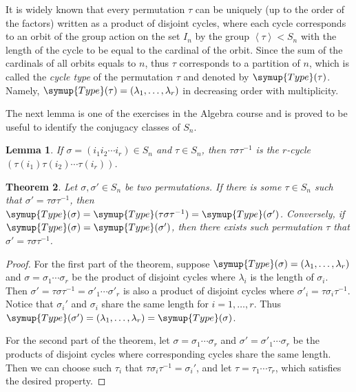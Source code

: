 \documentclass{assignment}[2019/10/15]
\newcommand{\lr}[3]{\left#1#3\right#2}
\theoremstyle{plain}
\newtheorem{theorem}{Theorem}[section]
\newtheorem{lemma}[theorem]{Lemma}
\newcommand{\Type}{\mathop{}\!\symup{Type}}
\begin{document}
    It is widely known that every permutation $\tau$ can be uniquely (up to the order of the factors) written as a product of disjoint cycles, where each cycle corresponds to an orbit of the group action on the set $I_n$ by the group $\lr<>\tau < S_n$ with the length of the cycle to be equal to the cardinal of the orbit. Since the sum of the cardinals of all orbits equals to $n$, thus $\tau$ corresponds to a partition of $n$, which is called the \emph{cycle type} of the permutation $\tau$ and denoted by $\Type(\tau)$. Namely, $\Type(\tau)=(\lambda_1, \dotsc, \lambda_r)$ in decreasing order with multiplicity.

    The next lemma is one of the exercises in the Algebra course and is proved to be useful to identify the conjugacy classes of $S_n$.

    \begin{lemma}
        If $\sigma = (i_1 i_2 \dotsb i_r)\in S_n$ and $\tau\in S_n$, then $\tau\sigma\tau^{-1}$ is the $r$-cycle $\left(\tau(i_1) \tau(i_2) \dotsb \tau(i_r)\right)$.
    \end{lemma}

    \begin{theorem}
        Let $\sigma, \sigma'\in S_n$ be two permutations. If there is some $\tau\in S_n$ such that $\sigma'=\tau\sigma\tau^{-1}$, then $\Type(\sigma)=\Type(\tau\sigma\tau^{-1}) = \Type(\sigma')$. Conversely, if $\Type(\sigma) = \Type(\sigma')$, then there exists such permutation $\tau$ that $\sigma' = \tau\sigma\tau^{-1}$.
    \end{theorem}

    \begin{proof}
        For the first part of the theorem, suppose $\Type(\sigma) = (\lambda_1, \dotsc, \lambda_r)$ and $\sigma=\sigma_1\dotsb\sigma_r$ be the product of disjoint cycles where $\lambda_i$ is the length of $\sigma_i$. Then $\sigma' = \tau\sigma\tau^{-1} = \sigma'_1\dotsb \sigma'_r$ is also a product of disjoint cycles where $\sigma'_i = \tau\sigma_i\tau^{-1}$. Notice that $\sigma_i'$ and $\sigma_i$ share the same length for $i= 1, \dotsc, r$. Thus $\Type(\sigma') = (\lambda_1, \dotsc, \lambda_r) = \Type(\sigma)$.

        For the second part of the theorem, let $\sigma=\sigma_1\dotsb\sigma_r$ and $\sigma'=\sigma'_1\dotsb\sigma_r$ be the products of disjoint cycles where corresponding cycles share the same length. Then we can choose such $\tau_i$ that $\tau\sigma_i\tau^{-1}=\sigma_i'$, and let $\tau = \tau_1\dotsb\tau_r$, which satisfies the desired property.
    \end{proof}
\end{document}

